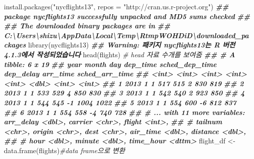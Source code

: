 \documentclass[
]{book}
\newenvironment{Shaded}{\begin{snugshade}}{\end{snugshade}}
\newcommand{\AttributeTok}[1]{\textcolor[rgb]{0.77,0.63,0.00}{#1}}
\newcommand{\CommentTok}[1]{\textcolor[rgb]{0.56,0.35,0.01}{\textit{#1}}}
\newcommand{\DocumentationTok}[1]{\textcolor[rgb]{0.56,0.35,0.01}{\textbf{\textit{#1}}}}
\newcommand{\FunctionTok}[1]{\textcolor[rgb]{0.00,0.00,0.00}{#1}}
\newcommand{\NormalTok}[1]{#1}
\newcommand{\OtherTok}[1]{\textcolor[rgb]{0.56,0.35,0.01}{#1}}
\newcommand{\StringTok}[1]{\textcolor[rgb]{0.31,0.60,0.02}{#1}}
\theoremstyle{definition}
\theoremstyle{definition}
\theoremstyle{definition}
\theoremstyle{definition}
\theoremstyle{remark}
\begin{document}
\begin{Shaded}
\begin{Highlighting}[]
\FunctionTok{install.packages}\NormalTok{(}\StringTok{"nycflights13"}\NormalTok{, }\AttributeTok{repos =} \StringTok{"http://cran.us.r{-}project.org"}\NormalTok{)}
\DocumentationTok{\#\# package \textquotesingle{}nycflights13\textquotesingle{} successfully unpacked and MD5 sums checked}
\DocumentationTok{\#\# }
\DocumentationTok{\#\# The downloaded binary packages are in}
\DocumentationTok{\#\#  C:\textbackslash{}Users\textbackslash{}shizu\textbackslash{}AppData\textbackslash{}Local\textbackslash{}Temp\textbackslash{}RtmpWOHDiD\textbackslash{}downloaded\_packages}
\FunctionTok{library}\NormalTok{(nycflights13)}
\DocumentationTok{\#\# Warning: 패키지 \textquotesingle{}nycflights13\textquotesingle{}는 R 버전 4.1.3에서 작성되었습니다}
\FunctionTok{head}\NormalTok{(flights) }\CommentTok{\# head 자료 수개를 보여줌}
\DocumentationTok{\#\# \# A tibble: 6 x 19}
\DocumentationTok{\#\#    year month   day dep\_time sched\_dep\_time dep\_delay arr\_time sched\_arr\_time}
\DocumentationTok{\#\#   \textless{}int\textgreater{} \textless{}int\textgreater{} \textless{}int\textgreater{}    \textless{}int\textgreater{}          \textless{}int\textgreater{}     \textless{}dbl\textgreater{}    \textless{}int\textgreater{}          \textless{}int\textgreater{}}
\DocumentationTok{\#\# 1  2013     1     1      517            515         2      830            819}
\DocumentationTok{\#\# 2  2013     1     1      533            529         4      850            830}
\DocumentationTok{\#\# 3  2013     1     1      542            540         2      923            850}
\DocumentationTok{\#\# 4  2013     1     1      544            545        {-}1     1004           1022}
\DocumentationTok{\#\# 5  2013     1     1      554            600        {-}6      812            837}
\DocumentationTok{\#\# 6  2013     1     1      554            558        {-}4      740            728}
\DocumentationTok{\#\# \# ... with 11 more variables: arr\_delay \textless{}dbl\textgreater{}, carrier \textless{}chr\textgreater{}, flight \textless{}int\textgreater{},}
\DocumentationTok{\#\# \#   tailnum \textless{}chr\textgreater{}, origin \textless{}chr\textgreater{}, dest \textless{}chr\textgreater{}, air\_time \textless{}dbl\textgreater{}, distance \textless{}dbl\textgreater{},}
\DocumentationTok{\#\# \#   hour \textless{}dbl\textgreater{}, minute \textless{}dbl\textgreater{}, time\_hour \textless{}dttm\textgreater{}}
\NormalTok{flight\_df }\OtherTok{\textless{}{-}}\FunctionTok{data.frame}\NormalTok{(flights)}\CommentTok{\#data frame으로 변환}

\end{Highlighting}
\end{Shaded}
\end{document}
